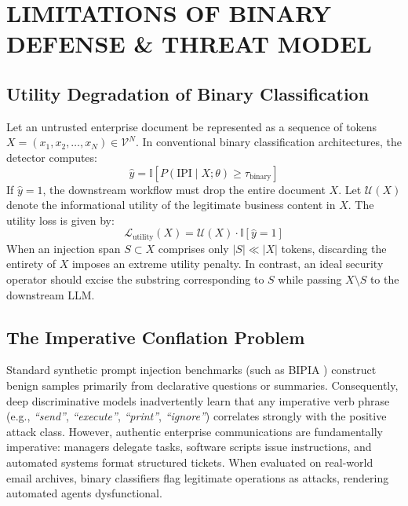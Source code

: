 \documentclass[conference]{IEEEtran}
\begin{document}
\section{LIMITATIONS OF BINARY DEFENSE \& THREAT MODEL}

\subsection{Utility Degradation of Binary Classification}

Let an untrusted enterprise document be represented as a sequence of tokens $X = (x_1, x_2, \dots, x_N) \in \mathcal{V}^N$. In conventional binary classification architectures, the detector computes:
\begin{equation}
    \hat{y} = \mathbb{I}[P(\text{IPI} \mid X; \theta) \ge \tau_{\text{binary}}]
\end{equation}
If $\hat{y} = 1$, the downstream workflow must drop the entire document $X$. Let $\mathcal{U}(X)$ denote the informational utility of the legitimate business content in $X$. The utility loss is given by:
\begin{equation}
    \mathcal{L}_{\text{utility}}(X) = \mathcal{U}(X) \cdot \mathbb{I}[\hat{y} = 1]
\end{equation}
When an injection span $S \subset X$ comprises only $|S| \ll |X|$ tokens, discarding the entirety of $X$ imposes an extreme utility penalty. In contrast, an ideal security operator should excise the substring corresponding to $S$ while passing $X \setminus S$ to the downstream LLM.

\subsection{The Imperative Conflation Problem}

Standard synthetic prompt injection benchmarks (such as BIPIA \cite{ref8}) construct benign samples primarily from declarative questions or summaries. Consequently, deep discriminative models inadvertently learn that any imperative verb phrase (e.g., \textit{``send''}, \textit{``execute''}, \textit{``print''}, \textit{``ignore''}) correlates strongly with the positive attack class. However, authentic enterprise communications are fundamentally imperative: managers delegate tasks, software scripts issue instructions, and automated systems format structured tickets. When evaluated on real-world email archives, binary classifiers flag legitimate operations as attacks, rendering automated agents dysfunctional.
\end{document}
